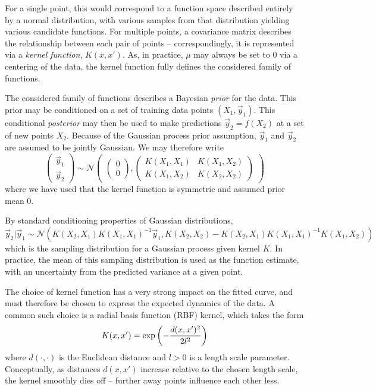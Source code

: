 For a single point, this would correspond to a function space described entirely by a normal distribution, 
with various samples from that distribution yielding various candidate functions. For multiple points, a 
covariance matrix describes the relationship between each pair of points -- correspondingly, it is represented 
via a \emph{kernel function}, $K(x, x')$. As, in practice, $\mu$ may always be set to 0 via a centering of the 
data, the kernel function fully defines the considered family of functions.

The considered family of functions describes a Bayesian \emph{prior} for the data. This prior may be conditioned 
on a set of training data points $(X_{1}, \vec{y}_1)$. This conditional \emph{posterior} may then be used to make 
predictions $\vec{y}_2 = f(X_2)$ at a set of new points $X_2$. Because of the Gaussian process prior assumption, 
$\vec{y}_1$ and $\vec{y}_2$ are assumed to be jointly Gaussian. We may therefore write
\begin{equation}
\begin{pmatrix}\vec{y}_1 \\ \vec{y}_2\end{pmatrix} \sim 
\mathcal{N}\begin{pmatrix}\begin{pmatrix}0\\0 \end{pmatrix}, 
\begin{pmatrix}K(X_1, X_1) & K(X_1, X_2)\\ K(X_1, X_2) & K(X_2, X_2)\end{pmatrix}\end{pmatrix}
\end{equation}
where we have used that the kernel function is symmetric and assumed prior mean 0. 

By standard conditioning properties of Gaussian distributions, 
\begin{equation}
\vec{y}_2 | \vec{y}_1 \sim \mathcal{N}(K(X_2, X_1)K(X_1,X_1)^{-1}\vec{y}_1, K(X_2, X_2)-K(X_2,X_1)K(X_1,X_1)^{-1}K(X_1, X_2))
\end{equation}
which is the sampling distribution for a Gaussian process given kernel $K$. In practice, the 
mean of this sampling distribution is used as the function estimate, with an uncertainty from the
predicted variance at a given point.

The choice of kernel function has a very strong impact on the fitted curve, and must therefore be chosen to 
express the expected dynamics of the data. A common such choice is a radial basis function (RBF) kernel, which 
takes the form
\begin{equation}
K(x, x') = \exp\qty(-\frac{d(x, x')^2}{2l^2})
\end{equation}
where $d(\cdot, \cdot)$ is the Euclidean distance and $l > 0$ is a length scale parameter. Conceptually, 
as distances $d(x, x')$ increase relative to the chosen length scale, the kernel smoothly dies off -- 
further away points influence each other less. 

